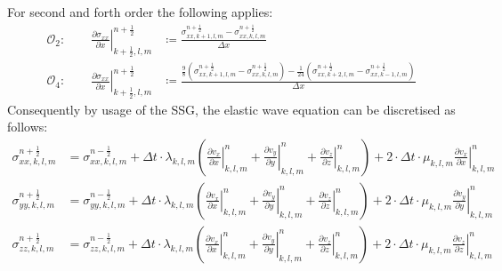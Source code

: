 \documentclass[pdftex,a4paper,parskip,listof=totoc,bibliography=totoc,onehalfspacing,12pt]{scrreprt}
\begin{document}
For second and forth order the following applies: 
\begin{align}
	\mathcal{O}_2: \qquad   \left.\frac{\partial\sigma_{xx}}{\partial x}\right\rvert_{k+\frac{1}{2},l,m}^{n+\frac{1}{2}} &\overset{}{\coloneqq} \frac{\sigma_{xx,k+1,l,m}^{n+\frac{1}{2}} - \sigma_{xx,k,l,m}^{n+\frac{1}{2}}}{\Delta x}\label{eqn:FDO2O}\\
	\mathcal{O}_4: \qquad  \left.\frac{\partial\sigma_{xx}}{\partial x}\right\rvert_{k+\frac{1}{2},l,m}^{n+\frac{1}{2}} &\overset{}{\coloneqq} \frac{\frac{9}{8}\left(\sigma_{xx,k+1,l,m}^{n+\frac{1}{2}} - \sigma_{xx,k,l,m}^{n+\frac{1}{2}}\right) - \frac{1}{24}\left(\sigma_{xx,k+2,l,m}^{n+\frac{1}{2}} - \sigma_{xx,k-1,l,m}^{n+\frac{1}{2}}\right)}{\Delta x}
\end{align}
Consequently by usage of the SSG, the elastic wave equation can be discretised as follows:
\begin{align*}
	\sigma_{xx,k,l,m}^{n+\frac{1}{2}} &= \sigma_{xx,k,l,m}^{n-\frac{1}{2}} + \Delta t \cdot \lambda_{k,l,m} \left( \left.\frac{\partial v_x}{\partial x}\right\rvert_{k,l,m}^n + \left.\frac{\partial v_y}{\partial y}\right\rvert_{k,l,m}^n + \left.\frac{\partial v_z}{\partial z}\right\rvert_{k,l,m}^n \right) + 2 \cdot \Delta t  \cdot\mu_{k,l,m} \left.\frac{\partial v_x}{\partial x}\right\rvert_{k,l,m}^n\\
	\sigma_{yy,k,l,m}^{n+\frac{1}{2}} &= \sigma_{yy,k,l,m}^{n-\frac{1}{2}} + \Delta t \cdot \lambda_{k,l,m} \left( \left.\frac{\partial v_x}{\partial x}\right\rvert_{k,l,m}^n + \left.\frac{\partial v_y}{\partial y}\right\rvert_{k,l,m}^n + \left.\frac{\partial v_z}{\partial z}\right\rvert_{k,l,m}^n \right) + 2 \cdot \Delta t \cdot \mu_{k,l,m} \left.\frac{\partial v_y}{\partial y}\right\rvert_{k,l,m}^n\\
	\sigma_{zz,k,l,m}^{n+\frac{1}{2}} &= \sigma_{zz,k,l,m}^{n-\frac{1}{2}} + \Delta t \cdot \lambda_{k,l,m} \left( \left.\frac{\partial v_x}{\partial x}\right\rvert_{k,l,m}^n + \left.\frac{\partial v_y}{\partial y}\right\rvert_{k,l,m}^n + \left.\frac{\partial v_z}{\partial z}\right\rvert_{k,l,m}^n \right) + 2 \cdot \Delta t \cdot \mu_{k,l,m} \left.\frac{\partial v_z}{\partial z}\right\rvert_{k,l,m}^n
\end{align*}
\end{document}
